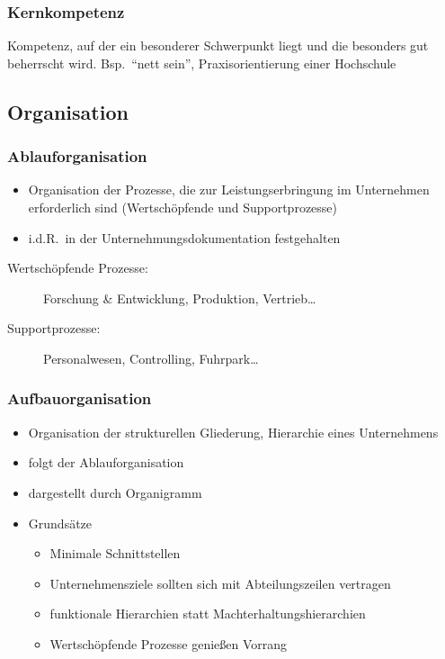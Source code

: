 \documentclass[a4paper, 12pt]{article}
\begin{document}
\subsubsection*{Kernkompetenz}
Kompetenz, auf der ein besonderer Schwerpunkt liegt und die besonders gut beherrscht wird. Bsp.\ ``nett sein'', Praxisorientierung einer Hochschule


\subsection{Organisation}

\subsubsection*{Ablauforganisation}
\begin{itemize}
  \item Organisation der Prozesse, die zur Leistungserbringung im Unternehmen erforderlich sind (Wertschöpfende und Supportprozesse)
  \item i.d.R.\ in der Unternehmungsdokumentation festgehalten
\end{itemize}
\begin{description}
  \item[Wertschöpfende Prozesse:] Forschung & Entwicklung, Produktion, Vertrieb\ldots
  \item[Supportprozesse:] Personalwesen, Controlling, Fuhrpark\ldots
\end{description}

\subsubsection*{Aufbauorganisation}
\begin{itemize}
  \item Organisation der strukturellen Gliederung, Hierarchie eines Unternehmens
  \item folgt der Ablauforganisation
  \item dargestellt durch Organigramm
  \item Grundsätze
    \begin{itemize}
      \item Minimale Schnittstellen
      \item Unternehmensziele sollten sich mit Abteilungszeilen vertragen
      \item funktionale Hierarchien statt Machterhaltungshierarchien
      \item Wertschöpfende Prozesse genießen Vorrang
    \end{itemize}
\end{itemize}
\end{document}
